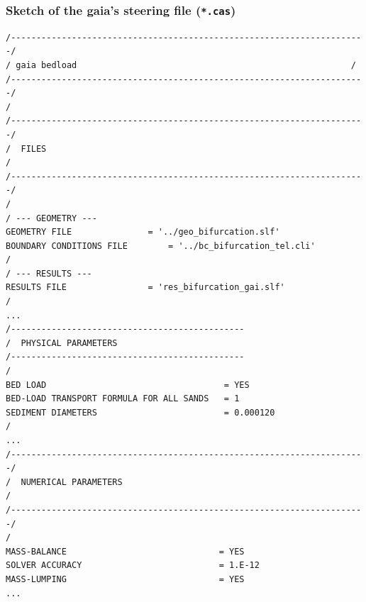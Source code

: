 {\subsubsection{Sketch of the gaia's steering file (\texttt{*.cas})}
\lstset{language=TelemacCas,
        basicstyle=\scriptsize\ttfamily}
\begin{lstlisting}[frame=trBL]
/----------------------------------------------------------------------/
/ gaia bedload                                                      /
/----------------------------------------------------------------------/
/
/----------------------------------------------------------------------/
/  FILES                                                               /
/----------------------------------------------------------------------/
/
/ --- GEOMETRY ---
GEOMETRY FILE				= '../geo_bifurcation.slf'
BOUNDARY CONDITIONS FILE		= '../bc_bifurcation_tel.cli'
/
/ --- RESULTS ---
RESULTS FILE				= 'res_bifurcation_gai.slf'
/
...
/----------------------------------------------
/  PHYSICAL PARAMETERS
/----------------------------------------------
/
BED LOAD                                   = YES
BED-LOAD TRANSPORT FORMULA FOR ALL SANDS   = 1
SEDIMENT DIAMETERS                         = 0.000120
/
...
/----------------------------------------------------------------------/
/  NUMERICAL PARAMETERS                                                /
/----------------------------------------------------------------------/
/
MASS-BALANCE                              = YES
SOLVER ACCURACY                           = 1.E-12
MASS-LUMPING                              = YES
...
\end{lstlisting}

}
